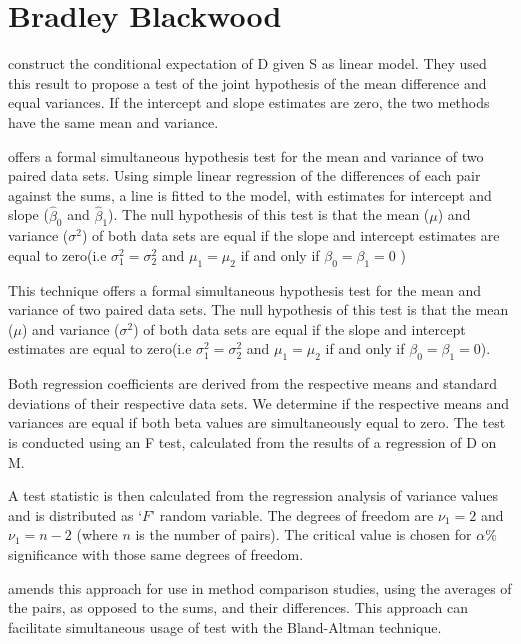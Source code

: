 \documentclass[12pt, a4paper]{report}
\theoremstyle{plain}
\theoremstyle{definition}
\theoremstyle{remark}
\begin{document}
\section{Bradley Blackwood}

\citet{BB89} construct the conditional expectation of D given S as linear model. They used this result to propose a test of the joint hypothesis of the mean difference and equal variances. If the intercept and slope estimates are zero, the two methods have the same mean and variance.

\citet{BB89} offers a formal simultaneous hypothesis test for the
mean and variance of two paired data sets. Using simple linear
regression of the differences of each pair against the sums, a
line is fitted to the model, with estimates for intercept and
slope ($\hat{\beta}_{0}$ and $\hat{\beta}_{1}$). The null
hypothesis of this test is that the mean ($\mu$) and variance
($\sigma^{2}$) of both data sets are equal if the slope and
intercept estimates are equal to zero(i.e $\sigma^{2}_{1} =
\sigma^{2}_{2}$ and $\mu_{1}=\mu_{2}$ if and only if $\beta_{0}=
\beta_{1}=0$ )

This technique offers a formal simultaneous hypothesis test for the mean and variance of two paired data sets. The null hypothesis of this test is that the mean ($\mu$) and variance ($\sigma^{2}$) of both data sets are equal if the slope and intercept estimates are equal to zero(i.e $\sigma^{2}_{1} =
\sigma^{2}_{2}$ and $\mu_{1}=\mu_{2}$ if and only if $\beta_{0}=
\beta_{1}=0$).

Both regression coefficients are derived from the respective means and
standard deviations of their respective data sets. We determine if the respective means and variances are equal if both beta values are simultaneously equal to zero. The test is conducted using an F test, calculated from the results of a regression of D on M.

A test statistic is then calculated from the regression analysis
of variance values \citep{BB89} and is distributed as `$F$' random
variable. The degrees of freedom are $\nu_{1}=2$ and $\nu_{1}=n-2$
(where $n$ is the number of pairs). The critical value is chosen
for $\alpha\%$ significance with those same degrees of freedom.

\citet{Bartko} amends this approach for use in method
comparison studies, using the averages of the pairs, as opposed to
the sums, and their differences. This approach can facilitate
simultaneous usage of test with the Bland-Altman technique.
\end{document}

